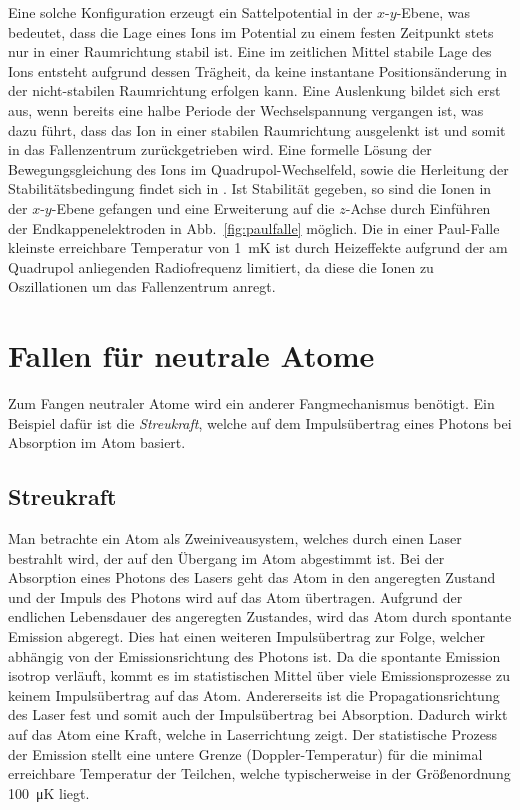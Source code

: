 \documentclass[twocolumn]{revtex4}
\begin{document}
Eine solche Konfiguration erzeugt ein Sattelpotential in der $x$-$y$-Ebene, was bedeutet, dass die Lage eines Ions im Potential zu einem festen Zeitpunkt stets nur in einer Raumrichtung stabil ist.
Eine im zeitlichen Mittel stabile Lage des Ions entsteht aufgrund dessen Trägheit, da keine instantane Positionsänderung in der nicht-stabilen Raumrichtung erfolgen kann.
Eine Auslenkung bildet sich erst aus, wenn bereits eine halbe Periode der Wechselspannung vergangen ist, was dazu führt, dass das Ion in einer stabilen Raumrichtung ausgelenkt ist und somit in das Fallenzentrum zurückgetrieben wird.
Eine formelle Lösung der Bewegungsgleichung des Ions im Quadrupol-Wechselfeld, sowie die Herleitung der Stabilitätsbedingung findet sich in \cite{foot}.
Ist Stabilität gegeben, so sind die Ionen in der $x$-$y$-Ebene gefangen und eine Erweiterung auf die $z$-Achse durch Einführen der Endkappenelektroden in Abb.~\ref{fig:paulfalle} möglich.
Die in einer Paul-Falle kleinste erreichbare Temperatur von \SI{1}{mK} ist durch Heizeffekte aufgrund der am Quadrupol anliegenden Radiofrequenz limitiert, da diese die Ionen zu Oszillationen um das Fallenzentrum anregt.

\section{Fallen für neutrale Atome}
Zum Fangen neutraler Atome wird ein anderer Fangmechanismus benötigt.
Ein Beispiel dafür ist die \emph{Streukraft}, welche auf dem Impulsübertrag eines Photons bei Absorption im Atom basiert.

\subsection{Streukraft}
Man betrachte ein Atom als Zweiniveausystem, welches durch einen Laser bestrahlt wird, der auf den Übergang im Atom abgestimmt ist.
Bei der Absorption eines Photons des Lasers geht das Atom in den angeregten Zustand und der Impuls des Photons wird auf das Atom übertragen.
Aufgrund der endlichen Lebensdauer des angeregten Zustandes, wird das Atom durch spontante Emission abgeregt. 
Dies hat einen weiteren Impulsübertrag zur Folge, welcher abhängig von der Emissionsrichtung des Photons ist.
Da die spontante Emission isotrop verläuft, kommt es im statistischen Mittel über viele Emissionsprozesse zu keinem Impulsübertrag auf das Atom.
Andererseits ist die Propagationsrichtung des Laser fest und somit auch der Impulsübertrag bei Absorption.
Dadurch wirkt auf das Atom eine Kraft, welche in Laserrichtung zeigt.
Der statistische Prozess der Emission stellt eine untere Grenze (Doppler-Temperatur) für die minimal erreichbare Temperatur der Teilchen, welche typischerweise in der Größenordnung \SI{100}{\micro\kelvin} liegt.
\end{document}
